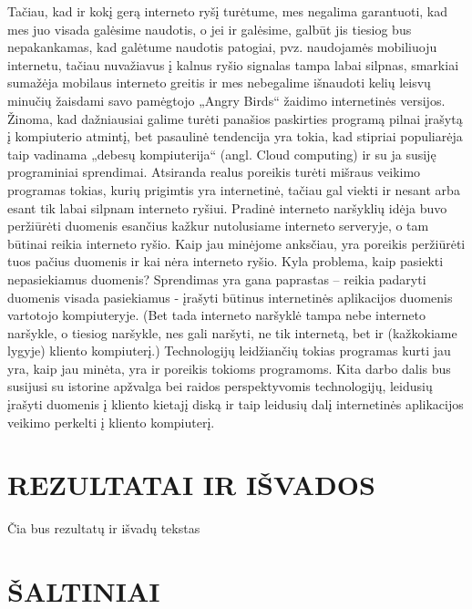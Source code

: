 \documentclass[12pt,a4paper,titlepage]{article}
\begin{document}
Tačiau, kad ir kokį gerą interneto ryšį turėtume, mes negalima garantuoti, kad mes juo visada galėsime naudotis, o jei ir galėsime, galbūt jis tiesiog bus nepakankamas, kad galėtume naudotis patogiai, pvz. naudojamės mobiliuoju internetu, tačiau nuvažiavus į kalnus ryšio signalas tampa labai silpnas, smarkiai sumažėja mobilaus interneto greitis ir mes nebegalime išnaudoti kelių leisvų minučių žaisdami savo pamėgtojo „Angry Birds“ žaidimo internetinės versijos. Žinoma, kad dažniausiai galime turėti panašios paskirties programą pilnai įrašytą į kompiuterio atmintį, bet pasaulinė tendencija yra tokia, kad stipriai populiarėja taip vadinama „debesų kompiuterija“ (angl. Cloud computing) ir su ja susiję programiniai sprendimai. Atsiranda realus poreikis turėti mišraus veikimo programas tokias, kurių prigimtis yra internetinė, tačiau gal viekti ir nesant arba esant tik labai silpnam interneto ryšiui. 
Pradinė interneto naršyklių idėja buvo peržiūrėti duomenis esančius kažkur nutolusiame interneto serveryje, o tam būtinai reikia interneto ryšio. Kaip jau minėjome anksčiau, yra poreikis peržiūrėti tuos pačius duomenis ir kai nėra interneto ryšio. Kyla problema, kaip pasiekti nepasiekiamus duomenis? Sprendimas yra gana paprastas – reikia padaryti duomenis visada pasiekiamus - įrašyti būtinus internetinės aplikacijos duomenis vartotojo kompiuteryje. (Bet tada interneto naršyklė tampa nebe interneto naršykle, o tiesiog naršykle, nes gali naršyti, ne tik internetą, bet ir (kažkokiame lygyje) kliento kompiuterį.) Technologijų leidžiančių tokias programas kurti jau yra, kaip jau minėta, yra ir poreikis tokioms programoms. Kita darbo dalis bus susijusi su istorine apžvalga bei raidos perspektyvomis technologijų, leidusių įrašyti duomenis į kliento kietajį diską ir taip leidusių dalį internetinės aplikacijos veikimo perkelti į kliento kompiuterį. 

\section*{REZULTATAI IR IŠVADOS}
Čia bus rezultatų ir išvadų tekstas

\section*{ŠALTINIAI}
\end{document}
